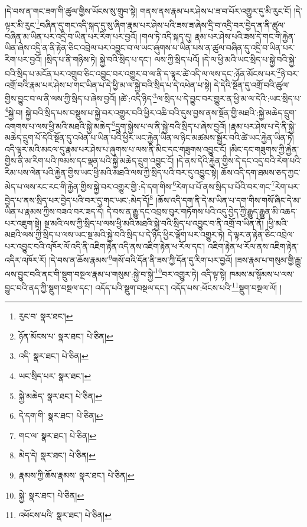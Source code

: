 །དེ་བས་ན་གང་ཟག་གི་ཚུལ་གྱིས་ཡོངས་སུ་གྲུབ་སྟེ། གནས་ནས་རྣམ་པར་ཤེས་པ་ཟ་བ་པོར་འགྱུར་དུ་མི་རུང་ངོ། །དེ་ལྟར་མི་རུང་\footnote{རུང་བ་  སྣར་ཐང་། }བཞིན་དུ་གང་འདི་སྐད་དུ་སུ་ཞིག་རྣམ་པར་ཤེས་པའི་ཟས་ཟ་ཞེས་དྲི་བ་འདྲི་བར་བྱེད་ན་ནི་ཚུལ་བཞིན་མ་ཡིན་པར་འདྲི་བ་ཡིན་པར་རིག་པར་བྱའོ། །གལ་ཏེ་འདི་སྐད་དུ། རྣམ་པར་ཤེས་པའི་ཟས་དེ་གང་གི་རྐྱེན་ཡིན་ཞེས་འདྲི་ན་ནི་རྟེན་ཅིང་འབྲེལ་པར་འབྱུང་བ་ལ་ཡང་ཞུགས་པ་ཡིན་པས་ན་ཚུལ་བཞིན་དུ་འདྲི་བ་ཡིན་པར་རིག་པར་བྱའོ། །སྲིད་པ་ནི་གཉིས་ཏེ། སྐྱེ་བའི་སྲིད་པ་དང་། ལས་ཀྱི་སྲིད་པའོ། །དེ་ལ་ཕྱི་མའི་ཡང་སྲིད་པ་སྐྱེ་བའི་སྐྱེ་བའི་སྲིད་པ་མངོན་པར་འགྲུབ་ཅིང་འབྱུང་བར་འགྱུར་བ་ལ་ནི་ད་ལྟར་ཚེ་འདི་ལ་ལས་དང་:ཉོན་མོངས་པར་\footnote{ཉོན་མོངས་པ་  སྣར་ཐང་།  པེ་ཅིན། }ཉེ་བར་འགྲོ་བའི་རྣམ་པར་ཤེས་པ་གང་ཡིན་པ་དེ་ཕྱི་མ་ལ་སྐྱེ་བའི་སྲིད་པ་དེ་འཕེན་པ་སྟེ། དེ་དེའི་སྔོན་དུ་འགྲོ་བའི་ཚུལ་གྱིས་བྱུང་བ་ལ་ནི་ལས་ཀྱི་སྲིད་པ་ཞེས་བྱའོ། །ཚེ་:འདི་ཉིད་\footnote{འདི་  སྣར་ཐང་།  པེ་ཅིན། }ལ་སྲིད་པ་དེ་བྱུང་བར་གྱུར་ན་ཕྱི་མ་ལ་དེའི་:ཡང་སྲིད་པ་\footnote{ཡང་སྲིད་པར་  སྣར་ཐང་། }སྐྱེ་བ། སྐྱེ་བའི་སྲིད་པས་བསྡུས་པ་སྐྱེ་བར་འགྱུར་བའི་ཕྱིར་འཆི་བའི་དུས་བྱས་ནས་སྔོན་གྱི་མཐའི་:སྐྱེ་མཆེད་དྲུག་འགགས་པ་ལས་ཕྱི་མའི་མཐའི་སྐྱེ་མཆེད་\footnote{སྐྱེ་མཆེད་  སྣར་ཐང་།  པེ་ཅིན། }དྲུག་སྐྱེས་པ་ལ་ནི་སྐྱེ་བའི་སྲིད་པ་ཞེས་བྱའོ། །རྣམ་པར་ཤེས་པ་དེ་ནི་སྐྱེ་མཆེད་དྲུག་པོ་དེའི་སྔོན་དུ་འཕེན་པ་ཡིན་པའི་ཕྱིར་ཡང་རྐྱེན་ཡིན་ལ་ཉིང་མཚམས་སྦྱོར་བའི་ཚེ་ཡང་རྐྱེན་ཡིན་ཏེ། འདི་ལྟར་མའི་མངལ་དུ་རྣམ་པར་ཤེས་པ་ཞུགས་པ་ལས་ནི་མིང་དང་གཟུགས་འབྱུང་ངོ། །མིང་དང་གཟུགས་ཀྱི་རྐྱེན་གྱིས་ནི་མ་རིག་པའི་ཁམས་དང་ལྡན་པའི་སྐྱེ་མཆེད་དྲུག་འབྱུང་ངོ། །དེ་ནས་དེའི་རྐྱེན་གྱིས་དེ་དང་འདྲ་བའི་རེག་པའི་རིམ་པས་ལེན་པའི་རྐྱེན་གྱིས་ཡང་ཕྱི་མའི་མཐའི་ལས་ཀྱི་སྲིད་པའི་བར་དུ་འབྱུང་སྟེ། ཆོས་འདི་དག་ཐམས་ཅད་ཀྱང་མེད་པ་ལས་རང་རང་གི་རྐྱེན་གྱིས་སྐྱེ་བར་འགྱུར་གྱི་:དེ་དག་གིས་\footnote{དེ་དག་གི་  སྣར་ཐང་།  པེ་ཅིན། }རེག་པ་པོ་ནས་སྲིད་པ་པོའི་བར་གང་\footnote{གང་ལ་  སྣར་ཐང་།  པེ་ཅིན། }རེག་པར་བྱེད་པ་ནས་སྲིད་པར་བྱེད་པའི་བར་དུ་གང་ཡང་:མེད་དོ།\footnote{མེད་དེ།  སྣར་ཐང་།  པེ་ཅིན། } །ཆོས་འདི་དག་ནི་དེ་མ་ཡིན་པ་དག་གིས་གསོ་ཞིང་དེ་མ་ཡིན་པ་རྣམས་ཀྱིས་བཟའ་བར་ཟད་དེ། དེ་བས་ན་རྒྱུ་དང་འབྲས་བུར་གཏོགས་པའི་འདུ་བྱེད་ཀྱི་རྒྱུད་རྒྱུན་མི་འཆད་པར་འཇུག་སྟེ། སྔ་མའི་ལས་ཀྱི་སྲིད་པ་ལས་ཕྱི་མའི་མཐའི་སྐྱེ་བའི་སྲིད་པ་འབྱུང་བ་ནི་འགྲོ་བ་ཡིན་ནོ། །ཕྱི་མའི་མཐའི་ལས་ཀྱི་སྲིད་པ་ལས་ཡང་སྔ་མའི་སྐྱེ་བའི་སྲིད་པ་དེ་ཉིད་ཕྱིར་ལྡོག་པར་འགྱུར་ཏེ། དེ་ལྟར་ན་རྟེན་ཅིང་འབྲེལ་པར་འབྱུང་བའི་འཁོར་ལོ་འདི་ནི་འཇིག་རྟེན་འདི་ནས་འཇིག་རྟེན་ཕ་རོལ་དང་། འཇིག་རྟེན་ཕ་རོལ་ནས་འཇིག་རྟེན་འདིར་འཁོར་རོ། །དེ་བས་ན་ཆོས་རྣམས་\footnote{རྣམས་ཀྱི་ཆོས་རྣམས་  སྣར་ཐང་།  པེ་ཅིན། }གསོ་བའི་དོན་ནི་ཟས་ཀྱི་དོན་དུ་རིག་པར་བྱའོ། །ཟས་རྣམ་པ་གསུམ་གྱི་རྒྱུ་ལས་བྱུང་བའི་ནང་གི་སྡུག་བསྔལ་རྣམ་པ་གསུམ་:སྐྱེ་བ་སྐྱེ་\footnote{སྐྱེ་  སྣར་ཐང་།  པེ་ཅིན། }བར་འགྱུར་ཏེ། འདི་ལྟ་སྟེ། ཁམས་མ་སྙོམས་པ་ལས་བྱུང་བའི་ནད་ཀྱི་སྡུག་བསྔལ་དང་། འདོད་པའི་སྡུག་བསྔལ་དང་། འདོད་པས་:ཕོངས་པའི་\footnote{འཕོངས་པའི་  སྣར་ཐང་།  པེ་ཅིན། }སྡུག་བསྔལ་ལོ། །

